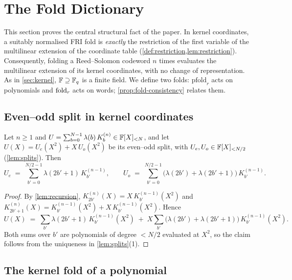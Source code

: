 \section{The Fold Dictionary}\label{sec:fold}

This section proves the central structural fact of the paper.
In kernel coordinates, a suitably normalised FRI fold is \emph{exactly} the restriction of the first variable of the multilinear extension of the coordinate table (\cref{def:restriction,lem:restriction}).
Consequently, folding a Reed--Solomon codeword $n$ times evaluates the multilinear extension of its kernel coordinates, with no change of representation.
As in \cref{sec:kernel}, $\mathbb{F} \supseteq \mathbb{F}_q$ is a finite field.
We define two folds: $\mathrm{pfold}_r$ acts on polynomials and $\mathrm{fold}_r$ acts on words; \cref{prop:fold-consistency} relates them.

\subsection{Even--odd split in kernel coordinates}\label{sec:fold:split}

\begin{proposition}\label{prop:split}
Let $n \ge 1$ and $U = \sum_{b=0}^{N-1} \lambda(b)\, K^{(n)}_b \in \mathbb{F}[X]_{<N}$, and let $U(X) = U_e(X^2) + X\,U_o(X^2)$ be its even--odd split, with $U_e, U_o \in \mathbb{F}[X]_{<N/2}$ (\cref{lem:splits}). Then
\[
  U_e \;=\; \sum_{b'=0}^{N/2-1} \lambda(2b'+1)\, K^{(n-1)}_{b'},
  \qquad
  U_o \;=\; \sum_{b'=0}^{N/2-1} \bigl(\lambda(2b') + \lambda(2b'+1)\bigr)\, K^{(n-1)}_{b'} .
\]
\end{proposition}

\begin{proof}
By \cref{lem:recursion}, $K^{(n)}_{2b'}(X) = X\, K^{(n-1)}_{b'}(X^2)$ and $K^{(n)}_{2b'+1}(X) = K^{(n-1)}_{b'}(X^2) + X\, K^{(n-1)}_{b'}(X^2)$. Hence
\[
  U(X) \;=\; \sum_{b'} \lambda(2b'+1)\, K^{(n-1)}_{b'}(X^2) \;+\; X \sum_{b'} \bigl(\lambda(2b') + \lambda(2b'+1)\bigr)\, K^{(n-1)}_{b'}(X^2).
\]
Both sums over $b'$ are polynomials of degree $< N/2$ evaluated at $X^2$, so the claim follows from the uniqueness in \cref{lem:splits}(1).
\end{proof}

\subsection{The kernel fold of a polynomial}\label{sec:fold:fold}

